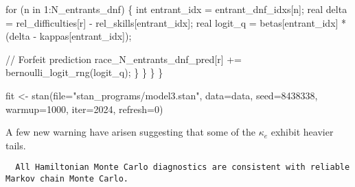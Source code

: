 \documentclass[
  letterpaper,
  DIV=11,
  numbers=noendperiod]{scrartcl}
\newenvironment{Shaded}{\begin{snugshade}}{\end{snugshade}}
\newcommand{\AttributeTok}[1]{\textcolor[rgb]{0.40,0.45,0.13}{#1}}
\newcommand{\CommentTok}[1]{\textcolor[rgb]{0.37,0.37,0.37}{#1}}
\newcommand{\ControlFlowTok}[1]{\textcolor[rgb]{0.00,0.23,0.31}{#1}}
\newcommand{\DataTypeTok}[1]{\textcolor[rgb]{0.68,0.00,0.00}{#1}}
\newcommand{\DecValTok}[1]{\textcolor[rgb]{0.68,0.00,0.00}{#1}}
\newcommand{\FunctionTok}[1]{\textcolor[rgb]{0.28,0.35,0.67}{#1}}
\newcommand{\NormalTok}[1]{\textcolor[rgb]{0.00,0.23,0.31}{#1}}
\newcommand{\OtherTok}[1]{\textcolor[rgb]{0.00,0.23,0.31}{#1}}
\newcommand{\SpecialCharTok}[1]{\textcolor[rgb]{0.37,0.37,0.37}{#1}}
\newcommand{\StringTok}[1]{\textcolor[rgb]{0.13,0.47,0.30}{#1}}
\begin{document}
\begin{codelisting}
\begin{Shaded}
\begin{Highlighting}[]
      \ControlFlowTok{for}\NormalTok{ (n }\ControlFlowTok{in} \DecValTok{1}\NormalTok{:N\_entrants\_dnf) \{}
        \DataTypeTok{int}\NormalTok{ entrant\_idx = entrant\_dnf\_idxs[n];}
        \DataTypeTok{real}\NormalTok{ delta = rel\_difficulties[r] {-} rel\_skills[entrant\_idx];}
        \DataTypeTok{real}\NormalTok{ logit\_q = betas[entrant\_idx] * (delta {-} kappas[entrant\_idx]);}

        \CommentTok{// Forfeit prediction}
\NormalTok{        race\_N\_entrants\_dnf\_pred[r] += bernoulli\_logit\_rng(logit\_q);}
\NormalTok{      \}}
\NormalTok{    \}}
\NormalTok{  \}}
\NormalTok{\}}
\end{Highlighting}
\end{Shaded}

\end{codelisting}

\begin{Shaded}
\begin{Highlighting}[]
\NormalTok{fit }\OtherTok{\textless{}{-}} \FunctionTok{stan}\NormalTok{(}\AttributeTok{file=}\StringTok{"stan\_programs/model3.stan"}\NormalTok{,}
            \AttributeTok{data=}\NormalTok{data, }\AttributeTok{seed=}\DecValTok{8438338}\NormalTok{,}
            \AttributeTok{warmup=}\DecValTok{1000}\NormalTok{, }\AttributeTok{iter=}\DecValTok{2024}\NormalTok{, }\AttributeTok{refresh=}\DecValTok{0}\NormalTok{)}
\end{Highlighting}
\end{Shaded}

A few new warning have arisen suggesting that some of the \(\kappa_{e}\)
exhibit heavier tails.

\begin{Shaded}
\end{Shaded}

\begin{verbatim}
  All Hamiltonian Monte Carlo diagnostics are consistent with reliable
Markov chain Monte Carlo.
\end{verbatim}
\end{document}
